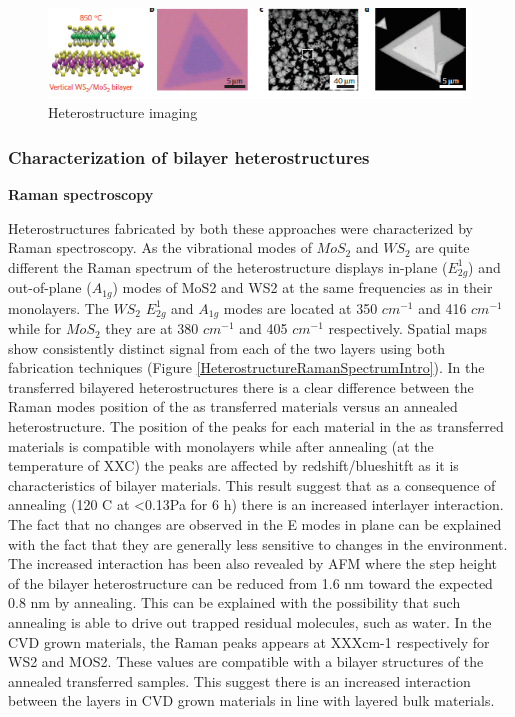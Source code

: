 \begin{figure}[h]
	\begin{center}
		\includegraphics[scale=1]{Heterostructures/HeterostructureOpticalSEMAFMImages.png}
		\caption{Heterostructure imaging}
		\label{fig:HeterostructuresOpticalSEMAFMImages}
	\end{center}
\end{figure}

\subsubsection{Characterization of bilayer heterostructures}

\textbf{Raman spectroscopy}

Heterostructures fabricated by both these approaches were characterized by Raman spectroscopy. As the vibrational modes of $MoS_2$ and $WS_2$ are quite different the Raman spectrum of the heterostructure displays in-plane ($E^1_{2g}$) and out-of-plane ($A_{1g}$) modes of MoS2 and WS2 at the same frequencies as in their monolayers. The $WS_2$ $E^1_{2g}$ and $A_{1g}$ modes are located at 350 $cm^{-1}$ and 416 $cm^{-1}$ while for $MoS_2$ they are at 380 $cm^{-1}$ and 405 $cm^{-1}$ respectively. Spatial maps show consistently distinct signal from each of the two layers using both fabrication techniques (Figure \ref{HeterostructureRamanSpectrumIntro}). In the transferred bilayered heterostructures there is a clear difference  between the Raman modes position of the as transferred materials versus  an annealed heterostructure. The position of the peaks for each material in the as transferred materials is compatible with  monolayers while after annealing (at the temperature of XXC) the peaks are affected by redshift/blueshitft as it is characteristics of bilayer materials. This result suggest that as a consequence of annealing (120 {\degree}C at <0.13Pa for 6 h) there is an increased interlayer interaction. The fact that no changes are observed in the E modes in plane can be explained with the fact that they are generally less sensitive to changes in the environment. The increased interaction has been also revealed by AFM where the  step height of the bilayer heterostructure can be reduced from 1.6 nm toward the expected 0.8 nm by annealing. This can be explained with the possibility that such annealing is able to drive out trapped residual molecules, such as water. In the CVD grown materials, the Raman peaks appears at XXXcm-1 respectively for WS2 and MOS2. These values are compatible with a bilayer structures of the annealed transferred samples. This suggest there is an increased interaction between the layers in CVD grown materials in line with layered bulk materials.

